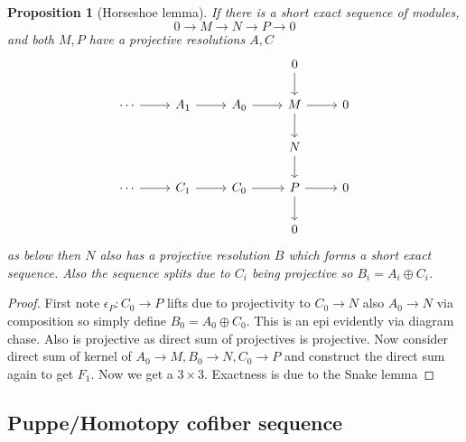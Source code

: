\documentclass[12pt]{article}
\numberwithin{equation}{section}
\newcounter{dummy} \numberwithin{dummy}{section}
\newtheorem{proposition}[dummy]{Proposition}
\begin{document}
\begin{appendices}
	\begin{proposition}[Horseshoe lemma]
		If there is a short exact sequence of modules,
		\[ 0 \to M \to N \to P \to 0 \]
		and both $M,P$ have a projective resolutions $A, C$ 
		\[\begin{tikzcd}
			&&& 0 \\
			\cdots & {A_1} & {A_0} & M & 0 \\
			&&& N \\
			\cdots & {C_1} & {C_0} & P & 0 \\
			&&& 0
			\arrow[from=2-4, to=2-5]
			\arrow[from=1-4, to=2-4]
			\arrow[from=2-4, to=3-4]
			\arrow[from=3-4, to=4-4]
			\arrow[from=4-4, to=4-5]
			\arrow[from=4-4, to=5-4]
			\arrow[ from=4-3, to=4-4]
			\arrow[ from=2-3, to=2-4]
			\arrow[from=2-1, to=2-2]
			\arrow[from=2-2, to=2-3]
			\arrow[from=4-1, to=4-2]
			\arrow[from=4-2, to=4-3]
		\end{tikzcd}\]
		as below then $N$ also has a projective resolution $B$ which forms a short exact sequence. Also the sequence splits due to $C_i$ being projective so $B_i=A_i \oplus C_i$.
	\end{proposition}
	\begin{proof}
		First note $\epsilon_P: C_0 \to P$ lifts due to projectivity to $C_0 \to N$ also $A_0\to N$ via composition so simply define $B_0 = A_0 \oplus C_0$. This is an epi evidently via diagram chase. Also is projective as direct sum of projectives is projective. Now consider direct sum of kernel of $A_0 \to M, B_0 \to N, C_0 \to P$ and construct the direct sum again to get $F_1$.	Now we get a $3\times 3$. Exactness is due to the Snake lemma
	\end{proof}
	\subsection{Puppe/Homotopy cofiber sequence}
	

\end{appendices}
\end{document}
